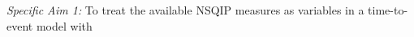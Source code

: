 \emph{Specific Aim 1:} To treat the available NSQIP measures as variables in a time-to-event model with 